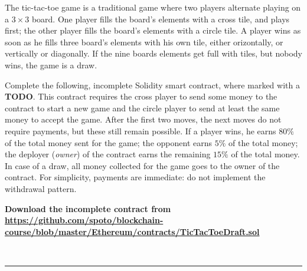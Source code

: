 \documentclass{article}
\begin{document}
The tic-tac-toe game is a traditional game where two players alternate
playing on a $3\times 3$ board. One player fills the board's elements with
a cross tile, and plays first; the other player fills the board's elements with
a circle tile. A player wins as soon as he
fills three board's elements with
his own tile, either orizontally, or vertically or diagonally.
If the nine boards elements get full with tiles, but nobody wins, the game
is a draw.

Complete the following, incomplete Solidity smart contract, where marked with a
\textbf{TODO}. This contract requires the cross player to send some money
to the contract to start a new game and the circle player to send
at least the same money to accept the game. After the first two moves,
the next moves do not require payments, but these still remain possible.
If a player wins, he earns $80\%$ of the total money sent for the game;
the opponent earns $5\%$ of the total money; the deployer (\emph{owner}) of
the contract earns the remaining $15\%$ of the total money. In case of a draw,
all money collected for the game goes to the owner of the contract.
For simplicity, payments are immediate: do not implement the withdrawal pattern.

\textbf{Download the incomplete contract from \url{https://github.com/spoto/blockchain-course/blob/master/Ethereum/contracts/TicTacToeDraft.sol}}

\mbox{}\\
\hrule
\mbox{}\\
\end{document}

